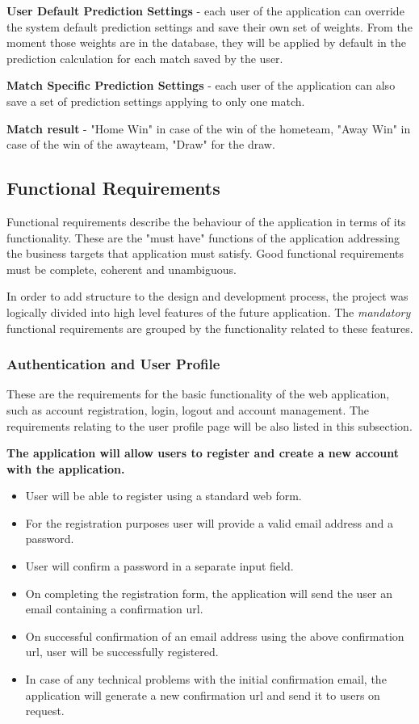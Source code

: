\textbf{User Default Prediction Settings} - each user of the application can override the system default prediction settings and save their own set of weights. From the moment those weights are in the database, they will be applied by default in the prediction calculation for each match saved by the user. 

\textbf{Match Specific Prediction Settings} - each user of the application can also save a set of prediction settings applying to only one match. 

\textbf{Match result} - "Home Win" in case of the win of the hometeam, "Away Win" in case of the win of the awayteam, "Draw" for the draw.

\subsection{Functional Requirements}
\label{sec:functionalrequirements_req}
Functional requirements describe the behaviour of the application in terms of its functionality. These are the "must have" functions of the application addressing the business targets that application must satisfy. Good functional requirements must be complete, coherent and unambiguous.
 
In order to add structure to the design and development process, the project was logically divided into high level features of the future application. The \emph{mandatory} functional requirements are grouped by the functionality related to these features.

\subsubsection{Authentication and User Profile}
\label{sec:authandprofile_req}
These are the requirements for the basic functionality of the web application, such as account registration, login, logout and account management. The requirements relating to the user profile page will be also listed in this subsection.

\textbf{The application will allow users to register and create a new account with the application.}
\begin{itemize}
  	\item User will be able to register using a standard web form.
  	\item For the registration purposes user will provide a valid email address and a password.
  	\item User will confirm a password in a separate input field.
  	\item On completing the registration form, the application will send the user an email containing a confirmation url.
  	\item On successful confirmation of an email address using the above confirmation url, user will be successfully registered.
  	\item In case of any technical problems with the initial confirmation email, the application will generate a new confirmation url and send it to users on request.
\end{itemize}

